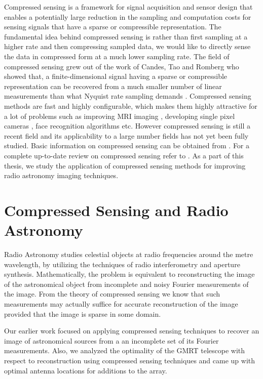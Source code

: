 Compressed sensing is a framework for signal acquisition and sensor design that enables a potentially large reduction in the sampling and computation costs for sensing signals that have a sparse or compressible representation. The fundamental idea behind compressed sensing is rather than first sampling at a higher rate and then compressing sampled data, we would like to directly sense the data in compressed form at a much lower sampling rate. The field of compressed sensing grew out of the work of  Candes, Tao and Romberg who showed that, a finite-dimensional signal having a sparse or compressible representation can be recovered from a much smaller number of linear measurements than what Nyquist rate sampling demands \cite{candes,Tao,romberg}. Compressed sensing methods are fast and highly configurable, which makes them highly attractive for a lot of problems such as 
improving MRI imaging \cite{Tao}, developing single pixel cameras \cite{single_pixel}, face recognition algorithms etc. However compressed sensing is still a recent field and its applicability to a large number fields has not yet been fully studied.
Basic information on compressed sensing can be obtained from \cite{cs_rice}. For a complete up-to-date review on compressed sensing refer to \cite{cs_book}. As a part of this thesis, we study the application of compressed sensing methods for improving radio astronomy imaging techniques.

\section*{Compressed Sensing and Radio Astronomy}
Radio Astronomy studies celestial objects at radio frequencies around the metre wavelength, by utilizing the techniques of radio interferometry and aperture synthesis. Mathematically, the problem is equivalent to reconstructing the image of the astronomical object from incomplete and noisy Fourier measurements of the image. From the theory of compressed sensing we know that such measurements may actually suffice for accurate reconstruction of the image provided that the image is sparse in some domain.

Our earlier work \cite{stage1} focused on applying compressed sensing techniques to recover an image of astronomical sources from a an incomplete set of its Fourier measurements. Also, we analyzed the optimality of the GMRT telescope \cite{GMRT} with respect to reconstruction using compressed sensing techniques and came up with optimal antenna locations for additions to the array. 

